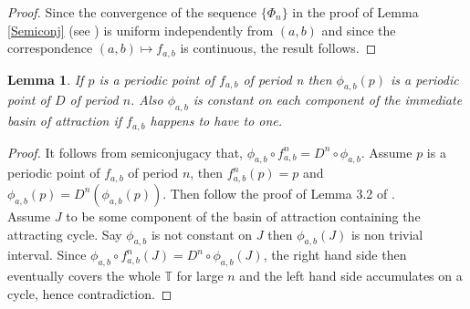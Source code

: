 \documentclass[12pt]{amsart}
\numberwithin{equation}{section}
\newtheorem{lemma}[theorem]{Lemma}
\theoremstyle{remark}
\begin{document}
\begin{proof}
    Since the convergence of the sequence $\{\Phi_n\}$
in the proof of Lemma \ref{Semiconj} (see \cite{MR})
is uniform independently from $(a, b)$ and since the correspondence $(a, b) \mapsto f_{a,b} $ is
continuous, the result follows.
\end{proof}
\begin{lemma}\label{periodic to periodic}
If $p$ is a periodic point of $f_{a,b}$ of period n then
$\phi_{a,b}(p)$ is a periodic point of $D$ of period $n$. Also $\phi_{a,b}$ is constant on each component of the immediate basin of attraction if $f_{a,b}$ happens to have to one. 
\end{lemma}
\begin{proof}
It follows from semiconjugacy that, $\phi_{a,b}\circ f^n_{a,b}=D^n\circ\phi_{a,b}$. Assume $p$ is a periodic point of $f_{a,b}$ of period $n$, then $f_{a,b}^n(p)=p$ and $\phi_{a,b}(p)=D^n(\phi_{a,b}(p))$. Then follow the proof of Lemma 3.2 of \cite{MR}. \\
\indent Assume $J$ to be some component of the basin of attraction containing the attracting cycle. Say $\phi_{a,b}$ is not constant on $J$ then $\phi_{a,b}(J)$ is non trivial interval.  Since $\phi_{a,b}\circ f^n_{a,b}(J)=D^n\circ\phi_{a,b}(J)$, the right hand side then eventually covers the whole $\mathbb{T}$ for large $n$ and the left hand side accumulates on a cycle, hence contradiction.
\end{proof}

\begin{center}
\label{lifts}
\end{center}

\vspace{.4cm}
\end{document}
